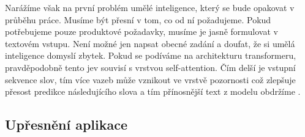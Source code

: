\documentclass[FM,DP]{tulthesis}
\begin{document}
		Narážíme však na první problém umělé inteligence, který se bude opakovat v průběhu práce. Musíme být přesní v tom, co od ní požadujeme. Pokud potřebujeme pouze produktové požadavky, musíme je jasně formulovat v textovém vstupu. Není možné jen napsat obecné zadání a doufat, že si umělá inteligence domyslí zbytek. Pokud se podíváme na architekturu transformeru, pravděpodobně tento jev souvisí s vrstvou self-attention. Čím delší je vstupní sekvence slov, tím více vazeb může vznikout ve vrstvě pozornosti což zlepšuje přesost predikce následujícího slova a tím přínosnější text z modelu obdržíme \cite{rothman2021transformers} \cite{context_understand}.
		
		
		\subsection{Upřesnění aplikace}
		\vspace{0.6em}
\end{document}
